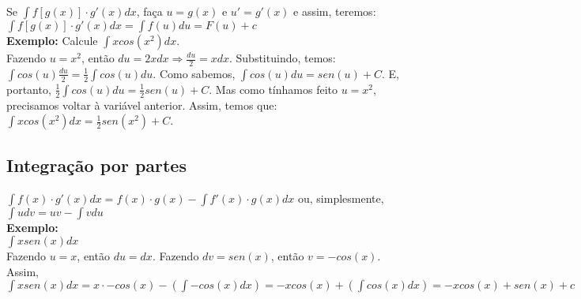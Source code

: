 \documentclass[12pt]{article}
\begin{document}
Se $\displaystyle\int{f[g(x)] \cdot g'(x)dx}$, faça $u = g(x)$ e $u' = g'(x)$ e
assim, teremos: $\displaystyle\int{f[g(x)] \cdot g'(x)dx} =
	\displaystyle\int{f(u)du} = F(u) + c$\\[2mm]
\textbf{Exemplo:} Calcule $\displaystyle\int{xcos(x^2)dx}$.\\[2mm]
Fazendo $u = x^2$, então $du = 2xdx \Rightarrow
	\displaystyle\frac{du}{2} = xdx$.
Substituindo, temos: $\displaystyle\int{cos(u)\frac{du}{2}} =
	\frac{1}{2}\int{cos(u)du}$.
Como sabemos, $\displaystyle\int{cos(u)du} = sen(u) + C$. E, portanto,
$\displaystyle\frac{1}{2}\int{cos(u)du} = \frac{1}{2}sen(u) + C$. Mas como
tínhamos feito $u = x^2$, precisamos voltar à variável anterior. Assim, temos
que: $\displaystyle\int{xcos(x^2)dx} = \frac{1}{2}sen(x^2) + C$.

\subsection{Integração por partes}

$\displaystyle\int{f(x) \cdot g'(x)dx} =
	f(x) \cdot g(x) - \displaystyle\int{f'(x) \cdot g(x)dx}$ ou, simplesmente,
$\displaystyle\int{udv} = uv - \displaystyle\int{vdu}$\\[4mm]
\textbf{Exemplo:}\\[2mm]
$\displaystyle\int{xsen(x)dx}$\\[2mm]
Fazendo $u = x$, então $du = dx$. Fazendo $dv = sen(x)$, então $v = -cos(x)$.
Assim,\\[2mm]
$\displaystyle\int{xsen(x)dx} = x \cdot -cos(x) -
	\left(\displaystyle\int{-cos(x)dx}\right) = -xcos(x) +
	\left(\displaystyle\int{cos(x)dx}\right) = -xcos(x) + sen(x) + c$
\end{document}
